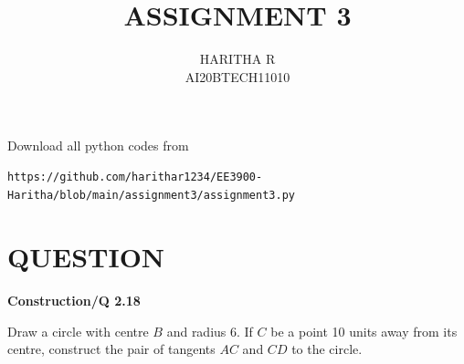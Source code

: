 \documentclass[journal,12pt,twocolumn]{IEEEtran}
\begin{document}
\let\vec\mathbf
\renewcommand{\thefigure}{\theproblem}
\def\putbox#1#2#3{\makebox[0in][l]{\makebox[#1][l]{}\raisebox{\baselineskip}[0in][0in]{\raisebox{#2}[0in][0in]{#3}}}}
     \def\rightbox#1{\makebox[0in][r]{#1}}
     \def\centbox#1{\makebox[0in]{#1}}
     \def\topbox#1{\raisebox{-\baselineskip}[0in][0in]{#1}}
     \def\midbox#1{\raisebox{-0.5\baselineskip}[0in][0in]{#1}}
\vspace{3cm}
\title{ ASSIGNMENT 3}
\author{HARITHA R\\ AI20BTECH11010}
\maketitle
\newpage
\bigskip
\renewcommand{\thefigure}{\arabic{figure}}
\renewcommand{\thetable}{\arabic{table}}
Download all python codes from
\begin{lstlisting}
https://github.com/harithar1234/EE3900-Haritha/blob/main/assignment3/assignment3.py
\end{lstlisting}
\section*{QUESTION}
\textbf{Construction/Q 2.18}
\begin{enumerate}
Draw a circle with centre $B$ and radius 6.  If $C$ be  a point 10 units  away from its 
centre, construct the pair of tangents $AC$ and $CD$ to the 
circle.
\end{enumerate}
\end{document}
